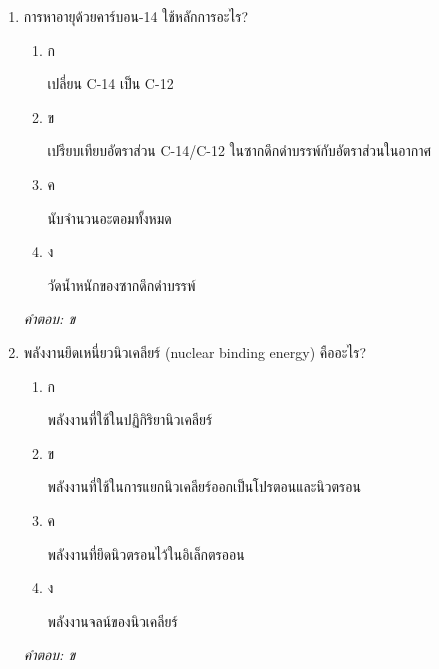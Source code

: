 \documentclass[12pt]{article}
\begin{document}
\begin{enumerate}[label=\arabic*., itemsep=0.5\baselineskip, topsep=0.5\baselineskip, leftmargin=*]
\item การหาอายุด้วยคาร์บอน-14 ใช้หลักการอะไร?
\begin{enumerate}[label=\alph*)., itemsep=0.3\baselineskip, topsep=0.3\baselineskip]
\item ก\ 
\begin{minipage}[t]{0.9\linewidth}
\raggedright เปลี่ยน C-14 เป็น C-12
\end{minipage}
\item ข\ 
\begin{minipage}[t]{0.9\linewidth}
\raggedright เปรียบเทียบอัตราส่วน C-14/C-12 ในซากดึกดำบรรพ์กับอัตราส่วนในอากาศ
\end{minipage}
\item ค\ 
\begin{minipage}[t]{0.9\linewidth}
\raggedright นับจำนวนอะตอมทั้งหมด
\end{minipage}
\item ง\ 
\begin{minipage}[t]{0.9\linewidth}
\raggedright วัดน้ำหนักของซากดึกดำบรรพ์
\end{minipage}
\end{enumerate}
\vspace{-0.3\baselineskip}
\begin{small}
\textit{คำตอบ: ข}
\end{small}

\item พลังงานยึดเหนี่ยวนิวเคลียร์ (nuclear binding energy) คืออะไร?
\begin{enumerate}[label=\alph*)., itemsep=0.3\baselineskip, topsep=0.3\baselineskip]
\item ก\ 
\begin{minipage}[t]{0.9\linewidth}
\raggedright พลังงานที่ใช้ในปฏิกิริยานิวเคลียร์
\end{minipage}
\item ข\ 
\begin{minipage}[t]{0.9\linewidth}
\raggedright พลังงานที่ใช้ในการแยกนิวเคลียร์ออกเป็นโปรตอนและนิวตรอน
\end{minipage}
\item ค\ 
\begin{minipage}[t]{0.9\linewidth}
\raggedright พลังงานที่ยึดนิวตรอนไว้ในอิเล็กตรออน
\end{minipage}
\item ง\ 
\begin{minipage}[t]{0.9\linewidth}
\raggedright พลังงานจลน์ของนิวเคลียร์
\end{minipage}
\end{enumerate}
\vspace{-0.3\baselineskip}
\begin{small}
\textit{คำตอบ: ข}
\end{small}


\end{enumerate}
\end{document}
